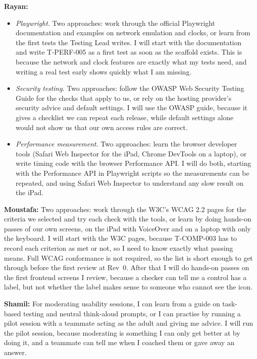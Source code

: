 \documentclass[12pt, titlepage]{article}
\begin{document}
\begin{enumerate}
\textbf{Rayan:}
\begin{itemize}
\item \emph{Playwright.} Two approaches: work through the official
Playwright documentation and examples on network emulation and clocks, or
learn from the first tests the Testing Lead writes. I will start with the
documentation and write T-PERF-005 as a first test as soon as the scaffold
exists. This is because the network and clock features are exactly what my
tests need, and writing a real test early shows quickly what I am missing.
\item \emph{Security testing.} Two approaches: follow the OWASP Web Security
Testing Guide for the checks that apply to us, or rely on the hosting
provider's security advice and default settings. I will use the OWASP
guide, because it gives a checklist we can repeat each release, while
default settings alone would not show us that our own access rules are
correct.
\item \emph{Performance measurement.} Two approaches: learn the browser
developer tools (Safari Web Inspector for the iPad, Chrome DevTools on a
laptop), or write timing code with the browser Performance API. I will do
both, starting with the Performance API in Playwright scripts so the
measurements can be repeated, and using Safari Web Inspector to understand
any slow result on the iPad.
\end{itemize}

\textbf{Moustafa:} Two approaches: work through the W3C's WCAG 2.2 pages for the
criteria we selected and try each check with the tools, or learn by doing
hands-on passes of our own screens, on the iPad with VoiceOver and on a laptop
with only the keyboard. I will start with the W3C pages, because T-COMP-003 has
to record each criterion as met or not, so I need to know exactly what passing
means. Full WCAG conformance is not required, so the list is short enough to get
through before the first review at Rev~0. After that I will do hands-on passes
on the first frontend screens I review, because a checker can tell me a control
has a label, but not whether the label makes sense to someone who cannot see the
icon.

\textbf{Shamil:} For moderating usability sessions, I can learn from a guide on 
task-based testing and neutral think-aloud prompts, or I can practise by running
a pilot session with a teammate acting as the adult and giving me advice. I will
run the pilot session, because moderating is something I can only get better at
by doing it, and a teammate can tell me when I coached them or gave away an answer.


\end{enumerate}
\end{document}

